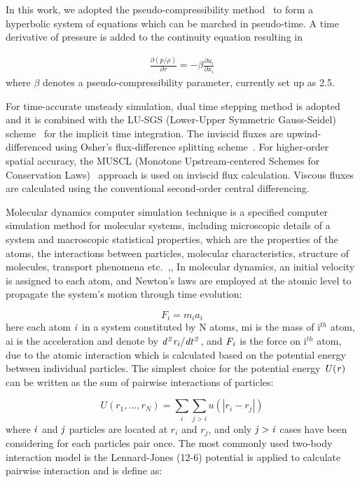 \documentclass[conference,final]{IEEEtran}
\begin{document}
In this work, we adopted the pseudo-compressibility method~\cite{PseudoCompressibility} to form a hyperbolic system of equations which can be marched in pseudo-time. A time derivative of pressure is added to the continuity equation resulting in

\vspace{-.2em}
\begin{eqnarray}
\frac{\partial (p/\rho)}{\partial \tau} = - \beta \frac{\partial {u}_{i}}{\partial {x}_{i}}
\end{eqnarray}
where $\beta$ denotes a pseudo-compressibility parameter, currently set up as 2.5.

For time-accurate unsteady simulation, dual time stepping method is adopted and it is combined with the LU-SGS (Lower-Upper Symmetric Gauss-Seidel) scheme~\cite{LU-SGS} for the implicit time integration. The inviscid fluxes are upwind-differenced using Osher's flux-difference splitting scheme~\cite{Osher}. For higher-order spatial accuracy, the MUSCL (Monotone Upstream-centered Schemes for Conservation Laws)~\cite{MUSCL} approach is used on inviscid flux calculation. Viscous fluxes are calculated using the conventional second-order central differencing.

Molecular dynamics computer simulation technique is a specified computer simulation method for molecular systems, including microscopic details of a system and macroscopic statistical properties, which are the properties of the atoms, the interactions between particles, molecular characteristics, structure of molecules, transport phenomena etc.~\cite{Allen},\cite{Haile},\cite{Rapaport} In molecular dynamics, an initial velocity is assigned to each atom, and Newton's laws are employed at the atomic level to propagate the system's motion through time evolution:

\vspace{-.2em}
\begin{equation}
F_{i} = m_{i}a_{i}
\label{eq:Newton}
\end{equation}
\normalsize
here each atom $\it i $ in a system constituted by N atoms, mi is the mass of i$^{th}$ atom, ai is the acceleration and denote by $\it {d^2r_{i}} / {dt^2}$, and $\it F_{i}$ is the force on i$^{th}$ atom, due to the atomic interaction which is calculated based on the potential energy between individual particles.
The simplest choice for the potential energy $\it U(r)$  can be written as the sum of pairwise interactions of particles:

\vspace{-.2em}
\begin{equation}
U(r_{1}, ...  ,r_{N}) =  \displaystyle\sum_{i} \displaystyle\sum_{j>i}  u(|r_{i} - r_{j}|)
\label{eq:PEnergy}
\end{equation}
\normalsize
where $\it i$ and $\it j$ particles are located at $r_{i}$ and $r_{j}$, and only $\it j>i$ cases have been considering for each particles pair once.
The most commonly used two-body interaction model is the Lennard-Jones (12-6) potential is applied to calculate pairwise interaction and is define as:
\end{document}
